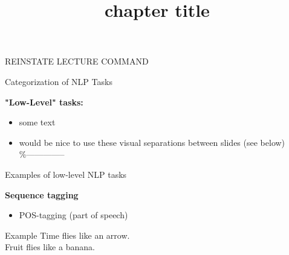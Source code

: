 


\newcommand*\POS[1]{\textsubscript{\texttt{#1}}} %
\usepackage{qtree} %

\newcommand{\learninggoals}{
\item defined the key learning goals here
\item second learning goal}

\title{chapter title}
\date{}


\begin{vbframe}{REINSTATE LECTURE COMMAND}
\end{vbframe}


\begin{vbframe}{Categorization of NLP Tasks}

\vfill

\textbf{"Low-Level" tasks:}

	\begin{itemize}
		\item some text
		\item would be nice to use these visual separations between slides (see below)\\
					\%--------------
	\end{itemize}

\vfill

\end{vbframe}


\begin{vbframe}{Examples of low-level NLP tasks}

\textbf{Sequence tagging}

\begin{itemize}
	\item POS-tagging (part of speech)
\end{itemize}
	
\begin{exampleblock}{Example}
	Time flies   like   an   arrow.\\Fruit   flies   like   a   banana.
\end{exampleblock}

\vfill

\end{vbframe}

